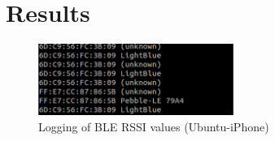 \section{Results}


\begin{figure}[!t]
	\centering
	\includegraphics[width=2.5in]{img/LogingRSSILinux}
	\caption{Logging of BLE RSSI values (Ubuntu-iPhone) }
	\label{fig_RSSI_Log}
\end{figure}
